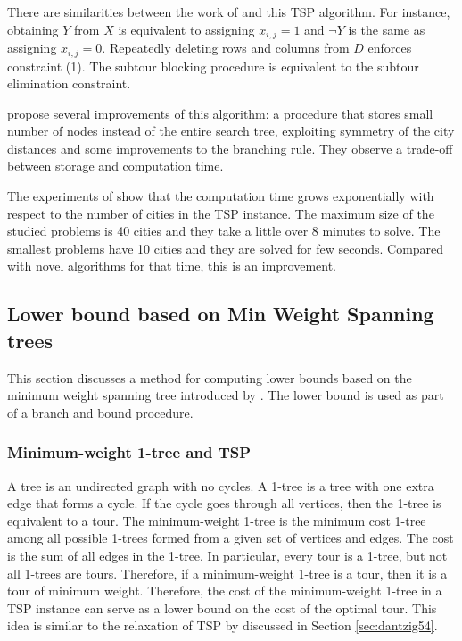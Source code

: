 \documentclass[a4paper,12pt]{article}
\begin{document}
There are similarities between the work of \citet{Dantzig54} and this TSP algorithm. For instance, obtaining $Y$ from $X$ is equivalent to assigning $x_{i,j} = 1$ and $\neg Y$ is the same as assigning $x_{i,j} = 0$. Repeatedly deleting rows and columns from $D$ enforces constraint (1). The subtour blocking procedure is equivalent to the subtour elimination constraint. 

\citet{Little63} propose several improvements of this algorithm: a procedure that stores small number of nodes instead of the entire search tree, exploiting symmetry of the city distances and some improvements to the branching rule. They observe a trade-off between storage and computation time.

The experiments of \citet{Little63} show that the computation time grows exponentially with respect to the number of cities in the TSP instance. The maximum size of the studied problems is 40 cities and they take a little over 8 minutes to solve. The smallest problems have 10 cities and they are solved for few seconds. Compared with novel algorithms for that time, this is an improvement.

\subsection{Lower bound based on Min Weight Spanning trees}
\label{sec:heldandkarp}
This section discusses a method for computing lower bounds based on the minimum weight spanning tree introduced by \citet{HeldK71}. The lower bound is used as part of a branch and bound procedure.

\subsubsection*{Minimum-weight 1-tree and TSP}
A tree is an undirected graph with no cycles. A 1-tree is a tree with one extra edge that forms a cycle. If the cycle goes through all vertices, then the 1-tree is equivalent to a tour. The minimum-weight 1-tree is the minimum cost 1-tree among all possible 1-trees formed from a given set of vertices and edges. The cost is the sum of all edges in the 1-tree. In particular, every tour is a 1-tree, but not all 1-trees are tours. Therefore, if a minimum-weight 1-tree is a tour, then it is a tour of minimum weight. Therefore, the cost of the minimum-weight 1-tree in a TSP instance can serve as a lower bound on the cost of the optimal tour. This idea is similar to the relaxation of TSP by \citet{Dantzig54} discussed in Section \ref{sec:dantzig54}.
\end{document}
